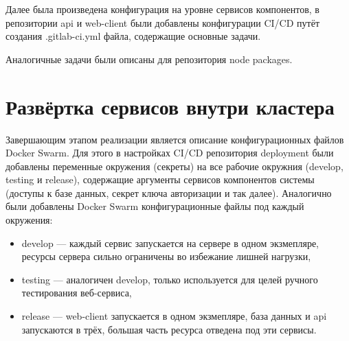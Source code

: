 Далее была произведена конфигурация на уровне сервисов компонентов, в репозитории api и web-client были добавлены конфигурации CI/CD путёт создания .gitlab-ci.yml файла, содержащие основные задачи.

Аналогичные задачи были описаны для репозитория node packages.

\section{Развёртка сервисов внутри кластера}

Завершающим этапом реализации является описание конфигурационных файлов Docker Swarm.
Для этого в настройках CI/CD репозитория deployment были добавлены переменные окружения (секреты) на все рабочие окружния (develop, testing и release),
содержащие аргументы сервисов компонентов системы (доступы к базе данных, секрет ключа авторизации и так далее)\cite{kuberForDevOps}.
Аналогично были добавлены Docker Swarm конфигурационные файлы под каждый окружения:

\begin{itemize}
    \item develop --- каждый сервис запускается на сервере в одном экзмепляре, ресурсы сервера сильно ограничены во избежание лишней нагрузки,
    \item testing --- аналогичен develop, только используется для целей ручного тестирования веб-сервиса,
    \item release --- web-client запускается в одном экзмепляре, база данных и api запускаются в трёх, большая часть ресурса отведена под эти сервисы.
\end{itemize}


